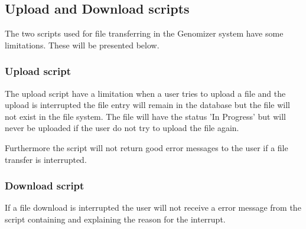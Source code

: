 \subsection{Upload and Download scripts}
The two scripts used for file transferring in the Genomizer system have some limitations. These will be presented below.
\subsubsection{Upload script}
The upload script have a limitation when a user tries to upload a file and the upload is interrupted the file entry will remain in the database but the file will not exist in the file system. The file will have the status 'In Progress' but will never be uploaded if the user do not try to upload the file again.

Furthermore the script will not return good error messages to the user if a file transfer is interrupted. 
\subsubsection{Download script}
If a file download is interrupted the user will not receive a error message from the script containing and explaining the reason for the interrupt. 

